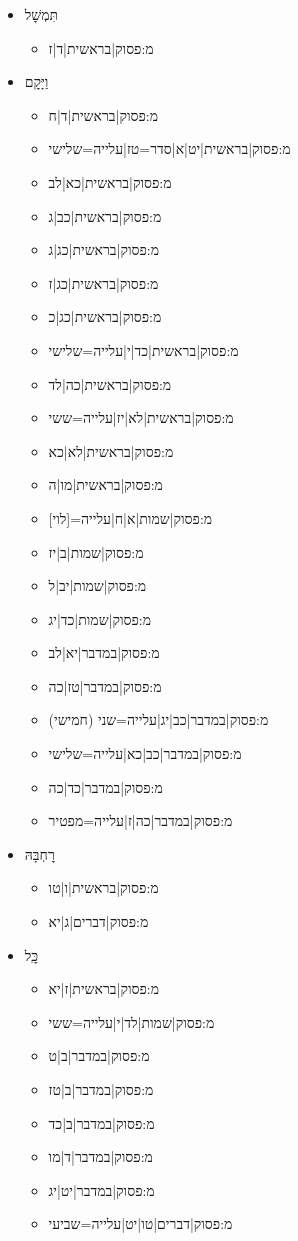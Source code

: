 \begin{itemize}
\begin{itemize}
\end{itemize}
 \item תִּמְשׇׁל
\begin{itemize} \item {{מ:פסוק|בראשית|ד|ז}}
\end{itemize}
 \item וַיָּקׇם
\begin{itemize} \item {{מ:פסוק|בראשית|ד|ח}}\item {{מ:פסוק|בראשית|יט|א|סדר=טז|עלייה=שלישי}}\item {{מ:פסוק|בראשית|כא|לב}}\item {{מ:פסוק|בראשית|כב|ג}}\item {{מ:פסוק|בראשית|כג|ג}}\item {{מ:פסוק|בראשית|כג|ז}}\item {{מ:פסוק|בראשית|כג|כ}}\item {{מ:פסוק|בראשית|כד|י|עלייה=שלישי}}\item {{מ:פסוק|בראשית|כה|לד}}\item {{מ:פסוק|בראשית|לא|יז|עלייה=ששי}}\item {{מ:פסוק|בראשית|לא|כא}}\item {{מ:פסוק|בראשית|מו|ה}}\item {{מ:פסוק|שמות|א|ח|עלייה=[לוי]}}\item {{מ:פסוק|שמות|ב|יז}}\item {{מ:פסוק|שמות|יב|ל}}\item {{מ:פסוק|שמות|כד|יג}}\item {{מ:פסוק|במדבר|יא|לב}}\item {{מ:פסוק|במדבר|טז|כה}}\item {{מ:פסוק|במדבר|כב|יג|עלייה=שני (חמישי)}}\item {{מ:פסוק|במדבר|כב|כא|עלייה=שלישי}}\item {{מ:פסוק|במדבר|כד|כה}}\item {{מ:פסוק|במדבר|כה|ז|עלייה=מפטיר}}
\end{itemize}
 \item רׇחְבָּהּ
\begin{itemize} \item {{מ:פסוק|בראשית|ו|טו}}\item {{מ:פסוק|דברים|ג|יא}}
\end{itemize}
 \item כׇּֽל
\begin{itemize} \item {{מ:פסוק|בראשית|ז|יא}}\item {{מ:פסוק|שמות|לד|י|עלייה=ששי}}\item {{מ:פסוק|במדבר|ב|ט}}\item {{מ:פסוק|במדבר|ב|טז}}\item {{מ:פסוק|במדבר|ב|כד}}\item {{מ:פסוק|במדבר|ד|מו}}\item {{מ:פסוק|במדבר|יט|יג}}\item {{מ:פסוק|דברים|טו|יט|עלייה=שביעי}}

\end{itemize}
\end{itemize}
